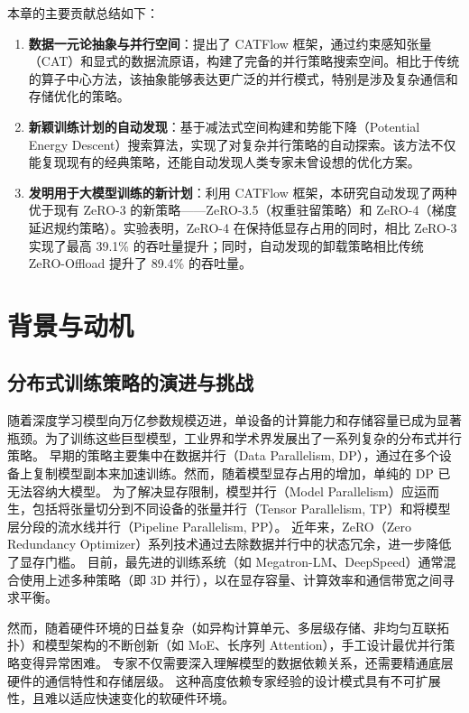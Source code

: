 本章的主要贡献总结如下：
\begin{enumerate}
    \item \textbf{数据一元论抽象与并行空间}：提出了 CATFlow 框架，通过约束感知张量（CAT）和显式的数据流原语，构建了完备的并行策略搜索空间。相比于传统的算子中心方法，该抽象能够表达更广泛的并行模式，特别是涉及复杂通信和存储优化的策略。
    \item \textbf{新颖训练计划的自动发现}：基于减法式空间构建和势能下降（Potential Energy Descent）搜索算法，实现了对复杂并行策略的自动探索。该方法不仅能复现现有的经典策略，还能自动发现人类专家未曾设想的优化方案。
    \item \textbf{发明用于大模型训练的新计划}：利用 CATFlow 框架，本研究自动发现了两种优于现有 ZeRO-3 的新策略——ZeRO-3.5（权重驻留策略）和 ZeRO-4（梯度延迟规约策略）。实验表明，ZeRO-4 在保持低显存占用的同时，相比 ZeRO-3 实现了最高 39.1\% 的吞吐量提升；同时，自动发现的卸载策略相比传统 ZeRO-Offload 提升了 89.4\% 的吞吐量。
\end{enumerate}

\section{背景与动机}

\subsection{分布式训练策略的演进与挑战}
随着深度学习模型向万亿参数规模迈进，单设备的计算能力和存储容量已成为显著瓶颈。为了训练这些巨型模型，工业界和学术界发展出了一系列复杂的分布式并行策略。
早期的策略主要集中在数据并行（Data Parallelism, DP），通过在多个设备上复制模型副本来加速训练。然而，随着模型显存占用的增加，单纯的 DP 已无法容纳大模型。
为了解决显存限制，模型并行（Model Parallelism）应运而生，包括将张量切分到不同设备的张量并行（Tensor Parallelism, TP）和将模型层分段的流水线并行（Pipeline Parallelism, PP）。
近年来，ZeRO（Zero Redundancy Optimizer）系列技术通过去除数据并行中的状态冗余，进一步降低了显存门槛。
目前，最先进的训练系统（如 Megatron-LM、DeepSpeed）通常混合使用上述多种策略（即 3D 并行），以在显存容量、计算效率和通信带宽之间寻求平衡。

然而，随着硬件环境的日益复杂（如异构计算单元、多层级存储、非均匀互联拓扑）和模型架构的不断创新（如 MoE、长序列 Attention），手工设计最优并行策略变得异常困难。
专家不仅需要深入理解模型的数据依赖关系，还需要精通底层硬件的通信特性和存储层级。
这种高度依赖专家经验的设计模式具有不可扩展性，且难以适应快速变化的软硬件环境。

